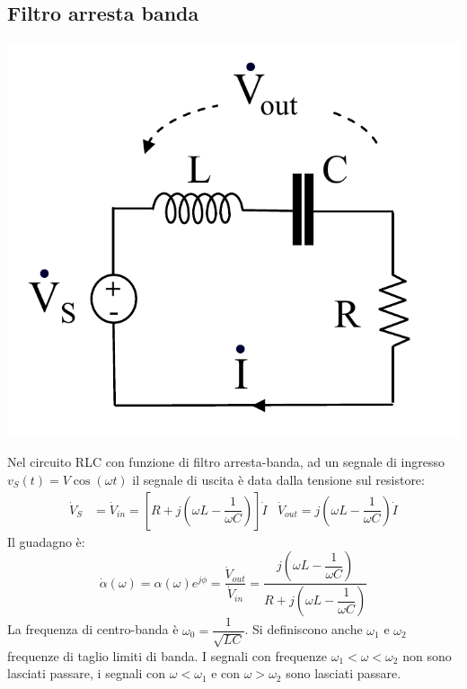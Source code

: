\documentclass{article}
\begin{document}
\subsection{Filtro arresta banda}
\begin{center}
    \includegraphics[scale=0.3]{Image/Arresta-banda_1.png}
\end{center}
Nel circuito RLC con funzione di filtro arresta-banda, ad un segnale di ingresso $v_S(t) = V \cos(\omega t)$ il segnale di uscita è data dalla tensione sul resistore:
\begin{align*}
    \dot V_S &= \dot V_{in} = \left[R + j\left(\omega L - \dfrac{1}{\omega C}\right)\right] \dot I & \dot V_{out} = j \left(\omega L - \dfrac{1}{\omega C}\right) \dot I
\end{align*}
Il guadagno è:
\[\dot \alpha(\omega)=\alpha(\omega) e^{j \phi}=\frac{\dot V_{out}}{\dot V_{in}}=\frac{j\left(\omega L - \dfrac{1}{\omega C}\right)}{R + j\left(\omega L - \dfrac{1}{\omega C}\right)}\]
La frequenza di centro-banda è $\omega_0= \dfrac{1}{\sqrt{LC}}$. Si definiscono anche $\omega_1$ e $\omega_2$ frequenze di taglio limiti di banda. I segnali con frequenze $\omega_1<\omega<\omega_2$ non sono lasciati passare, i segnali con $\omega < \omega_1$ e con $\omega > \omega_2$ sono lasciati passare.
\end{document}
